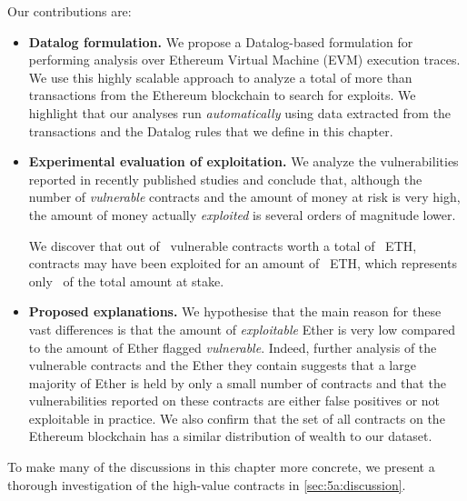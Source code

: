  Our contributions are:\itemsep=0pt
\begin{itemize}\itemsep=-2pt
\item \textbf{Datalog formulation.}
    We propose a Datalog-based formulation for performing analysis over Ethereum Virtual Machine (EVM) execution traces. We use this highly scalable approach to analyze a total of more than~ transactions from the Ethereum blockchain to search for exploits. We highlight that our analyses run \emph{automatically} using data extracted from the transactions and the Datalog rules that we define in this chapter.

\item \textbf{Experimental evaluation of exploitation.}
    We analyze the vulnerabilities reported in \PapersAnalyzed recently published studies and conclude that, although the number of \emph{vulnerable} contracts and the amount of money at risk is very high, the amount of money actually \emph{exploited} is several orders of magnitude lower.

    We discover that out of~\empirical{\VulnerableContracts} vulnerable contracts worth a total of~\empirical{\EtherStake} ETH,~\empirical{\NumExploitedContracts} contracts may have been exploited for an amount of~\empirical{\ExploitedEther} ETH, which represents only~\empirical{\PercentExploitedEther} of the total amount at stake.

\item \textbf{Proposed explanations.}
    We hypothesise that the main reason for these vast differences is that the amount of \emph{exploitable} Ether is very low compared to the amount of Ether flagged \emph{vulnerable}.
    Indeed, further analysis of the vulnerable contracts and the Ether they contain suggests that a large majority of Ether is held by only a small number of contracts and that the vulnerabilities reported on these contracts are either false positives or not exploitable in practice. We also confirm that the set of all contracts on the Ethereum blockchain has a similar distribution of wealth to our dataset.
\end{itemize}
To make many of the discussions in this chapter more concrete, we present a thorough investigation of the high-value contracts in \autoref{sec:5a:discussion}. 

